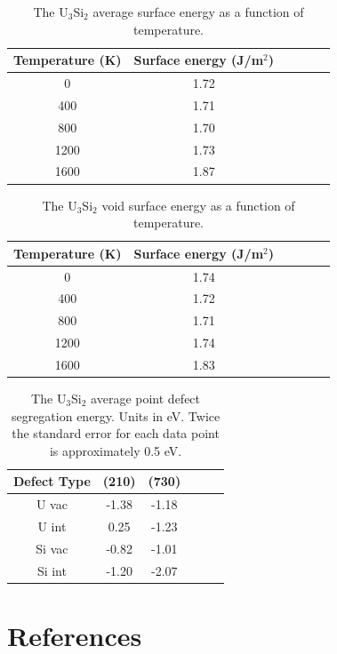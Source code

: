 \documentclass[review]{elsarticle}
\begin{document}
\begin{appendices}
\begin{table}[h]
\caption{The U$_{3}$Si$_{2}$ average surface energy as a function of temperature.} \label{tab:surf}
\begin{center}
\begin{tabular}{|c|c|c|c|c|c|}
	\hline
	Temperature (K) & Surface energy (J/m$^{2}$)\\
	 \hline
	 0 & 1.72	 \\
	 400 & 1.71 \\
	 800 & 1.70	 \\
	 1200 & 1.73 \\
	 1600 & 1.87 \\
	 \hline
\end{tabular}
\end{center}
\label{default}
\end{table}

\begin{table}[h]
\caption{The U$_{3}$Si$_{2}$ void surface energy as a function of temperature.} \label{tab:void}
\begin{center}
\begin{tabular}{|c|c|c|c|c|c|}
	\hline
	Temperature (K) & Surface energy (J/m$^{2}$)\\
	 \hline
	 0 & 1.74	 \\
	 400 & 1.72 \\
	 800 & 1.71	 \\
	 1200 & 1.74 \\
	 1600 & 1.83 \\
	 \hline
\end{tabular}
\end{center}
\label{default}
\end{table}

\begin{table}[h]
\caption{The U$_{3}$Si$_{2}$ average point defect segregation energy. Units in eV. Twice the standard error for each data point is approximately 0.5 eV.} \label{tab:seg}
\begin{center}
\begin{tabular}{|c|c|c|c|c|c|}
	\hline
	Defect Type & (210) & (730)\\
	 \hline
	 U vac & -1.38 & -1.18	 \\
	 U int & 0.25 & -1.23 \\
	 Si vac & -0.82 & -1.01	 \\
	 Si int & -1.20 & -2.07 \\
	 \hline
\end{tabular}
\end{center}
\label{default}
\end{table}

\FloatBarrier
\end{appendices}

\section{References}


\end{document}
